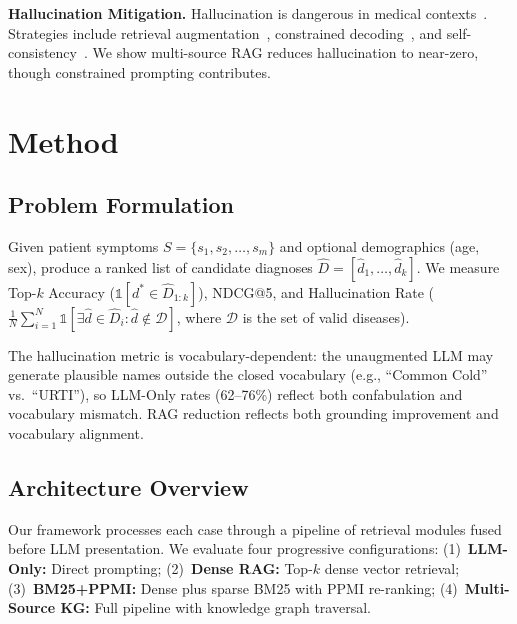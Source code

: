 \documentclass[runningheads]{llncs}
\begin{document}
\textbf{Hallucination Mitigation.} Hallucination is dangerous in medical contexts~\cite{ji2023survey,umapathi2023med}. Strategies include retrieval augmentation~\cite{shuster2021retrieval}, constrained decoding~\cite{lu2022neurologic}, and self-consistency~\cite{manakul2023selfcheckgpt}. We show multi-source RAG reduces hallucination to near-zero, though constrained prompting contributes.

\section{Method}
\label{sec:method}

\subsection{Problem Formulation}

Given patient symptoms $S = \{s_1, s_2, \ldots, s_m\}$ and optional demographics (age, sex), produce a ranked list of candidate diagnoses $\hat{D} = [\hat{d}_1, \ldots, \hat{d}_k]$. We measure Top-$k$ Accuracy ($\mathbb{1}[d^* \in \hat{D}_{1:k}]$), NDCG@5, and Hallucination Rate ($\frac{1}{N}\sum_{i=1}^{N} \mathbb{1}[\exists \hat{d} \in \hat{D}_i : \hat{d} \notin \mathcal{D}]$, where $\mathcal{D}$ is the set of valid diseases).

The hallucination metric is vocabulary-dependent: the unaugmented LLM may generate plausible names outside the closed vocabulary (e.g., ``Common Cold'' vs.\ ``URTI''), so LLM-Only rates (62--76\%) reflect both confabulation and vocabulary mismatch. RAG reduction reflects both grounding improvement and vocabulary alignment.

\subsection{Architecture Overview}

Our framework processes each case through a pipeline of retrieval modules fused before LLM presentation. We evaluate four progressive configurations:
(1)~\textbf{LLM-Only:} Direct prompting;
(2)~\textbf{Dense RAG:} Top-$k$ dense vector retrieval;
(3)~\textbf{BM25+PPMI:} Dense plus sparse BM25 with PPMI re-ranking;
(4)~\textbf{Multi-Source KG:} Full pipeline with knowledge graph traversal.
\end{document}
